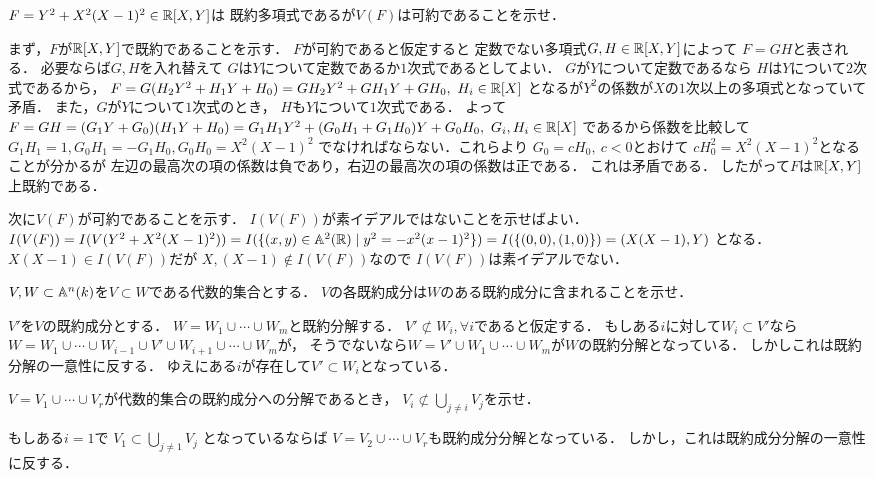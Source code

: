 \begin{prob}
  $F = Y^2 + X^2(X-1)^2 \in \mathbb{R}[X,Y] $は
  既約多項式であるが$V(F)$は可約であることを示せ．
\end{prob}
\begin{ans}
  まず，$F$が$\mathbb{R}[X,Y]$で既約であることを示す．
  $F$が可約であると仮定すると
  定数でない多項式$G,H \in \mathbb{R}[X,Y]$によって
  $F = GH$と表される．
  必要ならば$G,H$を入れ替えて
  $G$は$Y$について定数であるか$1$次式であるとしてよい．
  $G$が$Y$について定数であるなら
  $H$は$Y$について$2$次式であるから，
  $F = G(H_2Y^2 + H_1Y + H_0) = GH_2Y^2 + GH_1Y + GH_0 ,\ H_i \in \mathbb{R}[X] $
  となるが$Y^2$の係数が$X$の$1$次以上の多項式となっていて矛盾．
  また，$G$が$Y$について$1$次式のとき，
  $H$も$Y$について$1$次式である．
  よって
  $ F = GH = (G_1Y + G_0)(H_1Y + H_0)
  = G_1H_1 Y^2 + (G_0H_1 + G_1H_0) Y + G_0H_0, \ G_i, H_i \in \mathbb{R}[X] $
  であるから係数を比較して
  $G_1 H_1 = 1, G_0 H_1 = -G_1 H_0, G_0H_0 = X^2(X-1)^2 $
  でなければならない．これらより
  $ G_0 = c H_0 , \ c < 0$とおけて
  $c H_0^2 = X^2(X-1)^2 $となることが分かるが
  左辺の最高次の項の係数は負であり，右辺の最高次の項の係数は正である．
  これは矛盾である．
  したがって$F$は$\mathbb{R}[X,Y]$上既約である．
  
  次に$V(F)$が可約であることを示す．
  $I(V(F))$が素イデアルではないことを示せばよい．
  $I(V(F)) = I(V(Y^2 + X^2(X-1)^2))
  = I( \{ (x,y)\in\mathbb{A}^2(\mathbb{R}) \mid y^2 = -x^2(x-1)^2 \} )
  = I( \{ (0,0), (1,0) \} )
  = (X(X-1), Y) $
  となる．
  $X(X-1) \in I(V(F))$だが
  $X,(X-1) \not\in I(V(F)) $なので
  $I(V(F))$は素イデアルでない．
\end{ans}

\begin{prob}
  $V,W\subset \mathbb{A}^n(k)$を$V\subset W$である代数的集合とする．
  $V$の各既約成分は$W$のある既約成分に含まれることを示せ．
\end{prob}
\begin{ans}
  $V'$を$V$の既約成分とする．
  $W = W_1 \cup \cdots \cup W_m $と既約分解する．
  $V' \not \subset W_i, \forall i$であると仮定する．
  もしある$i$に対して$W_i \subset V'$なら
  $W = W_1 \cup \cdots \cup W_{i-1} \cup V' \cup W_{i+1} \cup \cdots \cup W_m $が，
  そうでないなら$W = V' \cup W_1 \cup \cdots \cup W_m $が$W$の既約分解となっている．
  しかしこれは既約分解の一意性に反する．
  ゆえにある$i$が存在して$V' \subset W_i $となっている．
\end{ans}

\begin{prob}
  $V = V_1 \cup \cdots \cup V_r $が代数的集合の既約成分への分解であるとき，
  $ V_i \not \subset \bigcup_{j\ne i} V_j$を示せ．
\end{prob}
\begin{ans}
  もしある$i=1$で
  $ V_1 \subset \bigcup_{j\ne 1} V_j$
  となっているならば
  $ V = V_2 \cup \cdots \cup V_r $も既約成分分解となっている．
  しかし，これは既約成分分解の一意性に反する．
\end{ans}
